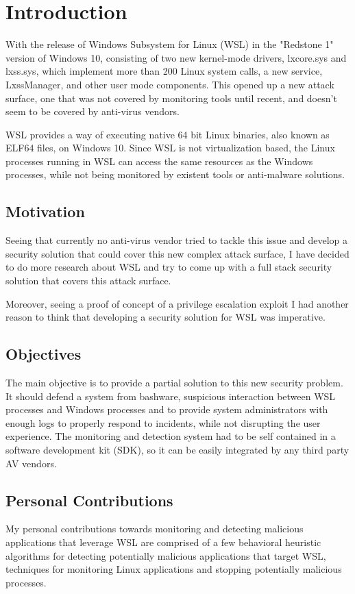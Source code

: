\chapter{Introduction}
    With the release of Windows Subsystem for Linux (WSL) in the "Redstone 1" version of Windows 10, consisting of two new kernel-mode drivers,
    lxcore.sys and lxss.sys, which implement more than  200 Linux system calls, a new service, LxssManager, and other user mode components.
    This opened up a new attack surface, one that was not covered by monitoring tools until recent, and doesn't seem to be covered by
    anti-virus vendors.

    WSL provides a way of executing native 64 bit Linux binaries, also known as ELF64 files, on Windows 10. Since WSL is not virtualization
    based, the Linux processes running in WSL can access the same resources as the Windows processes, while not being monitored by existent
    tools or anti-malware solutions.

    \section{Motivation}
        Seeing that currently no anti-virus vendor tried to tackle this issue and develop a security solution that could cover this new
        complex attack surface, I have decided to do more research about WSL and try to come up with a full stack security solution that covers
        this attack surface.
        
        Moreover, seeing a proof of concept of a privilege escalation exploit I had another reason to think that developing a security solution
        for WSL was imperative.

    \section{Objectives}
        The main objective is to provide a partial solution to this new security problem. It should defend a system from bashware,
        suspicious interaction between WSL processes and Windows processes and to provide system administrators with enough logs to properly
        respond to incidents, while not disrupting the user experience. The monitoring and detection system had to be self contained in
        a software development kit (SDK), so it can be easily integrated by any third party AV vendors.

    \section{Personal Contributions}
        My personal contributions towards monitoring and detecting malicious applications that leverage WSL are comprised of a few behavioral
        heuristic algorithms for detecting potentially malicious applications that target WSL, techniques for monitoring Linux applications
        and stopping potentially malicious processes.

